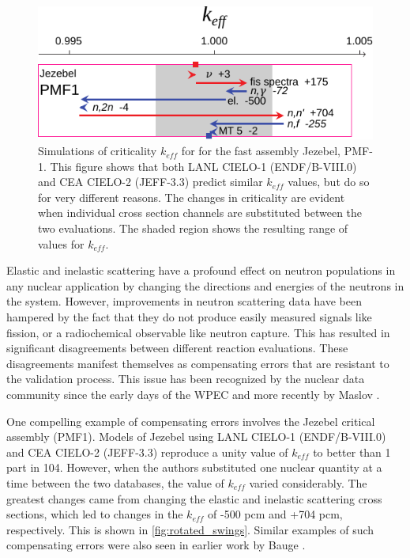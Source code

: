 \documentclass[letterpaper]{ar-1col}
\begin{document}
\begin{figure}[b]
 \centering
 \includegraphics[width=0.7\linewidth]{rotated_swings.pdf}

 \caption{Simulations of criticality $k_{eff}$ for  for the fast assembly Jezebel, PMF-1.
This figure shows that both LANL CIELO-1 (ENDF/B-VIII.0) and CEA CIELO-2 (JEFF-3.3) predict similar $k_{eff}$ values, but do so for very different reasons.
The changes in criticality are evident when individual cross section channels are substituted between the two evaluations.
 The shaded region shows the  resulting range of values for $k_{eff}$.}
 \label{fig:rotated_swings}
\end{figure}


Elastic and inelastic scattering have a profound effect on neutron populations in any nuclear application by changing the directions and energies of the neutrons in the system.
 However, improvements in neutron scattering data have been hampered by the fact that they do not produce easily measured signals like fission, or a radiochemical observable like neutron capture.
 This has resulted in significant disagreements between different reaction evaluations.
 These disagreements manifest themselves as compensating errors that are resistant to the validation process.
 This issue has been recognized by the nuclear data community since the early days of the WPEC \cite{Row89} and more recently by Maslov \cite{Mas11}.

One compelling example of compensating errors involves the Jezebel  critical assembly (PMF1).
 Models of Jezebel using LANL CIELO-1 (ENDF/B-VIII.0) and CEA CIELO-2 (JEFF-3.3) reproduce a unity value of $k_{eff}$ to better than 1 part in 104.
 However, when the authors substituted one nuclear quantity at a time between the two databases, the value of $k_{eff}$ varied considerably.
 The greatest changes came from changing the elastic and inelastic scattering cross sections, which led to changes in the $k_{eff}$ of -500 pcm and +704 pcm, respectively.  This is shown in \autoref{fig:rotated_swings}.  Similar examples of such compensating errors were also seen in earlier work by Bauge \cite{Bau12}.
\end{document}
